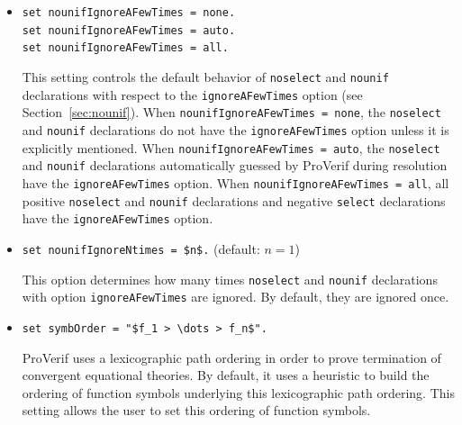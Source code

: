 \documentclass{book}
\begin{document}
\begin{itemize}
This setting modifies the expansion of terms to into processes.
With \lstinline{expandSimplifyIfCst = true},
if a process \lstinline!if $M$ then $P$ else $Q$! occurs during
this expansion and $M$ is \lstinline!true!, then this process is
transformed into $P$.
If this process occurs and $M$ is \lstinline!false!, then this process
is transformed into $Q$.
This transformation is useful because the expansion of terms into
processes may introduce such tests with constant conditions.
However, the transformation will be performed even if
the constant was already there in the initial process, which may
cut part of the process, and for instance remove restrictions that occur
in the initial process and are needed for some queries or secrecy assumptions.

With the setting \lstinline{set expandSimplifyIfCst = false.},
this transformation is not performed.

\item \lstinline{set nounifIgnoreAFewTimes = none.}\\
\lstinline{set nounifIgnoreAFewTimes = auto.}\\
\lstinline{set nounifIgnoreAFewTimes = all.}

This setting controls the default behavior of \lstinline{noselect} and
\lstinline{nounif}
declarations with respect to the \lstinline{ignoreAFewTimes} option
(see Section~\ref{sec:nounif}).
When \lstinline{nounifIgnoreAFewTimes = none}, the \lstinline{noselect} and \lstinline{nounif}
declarations do not have the \lstinline{ignoreAFewTimes} option
unless it is explicitly mentioned.
When \lstinline{nounifIgnoreAFewTimes = auto}, the \lstinline{noselect} and \lstinline{nounif}
declarations automatically guessed by ProVerif during resolution
have the \lstinline{ignoreAFewTimes} option.
When \lstinline{nounifIgnoreAFewTimes = all}, all positive \lstinline{noselect} and \lstinline{nounif}
declarations and negative \lstinline{select} declarations have the \lstinline{ignoreAFewTimes} option.

\item \lstinline{set nounifIgnoreNtimes = $n$.} (default: $n = 1$)

This option determines how many times \lstinline{noselect} and \lstinline{nounif} declarations
with option \lstinline{ignoreAFewTimes} are ignored. By default,
they are ignored once.

\item \lstinline{set symbOrder = "$f_1 > \dots > f_n$".}

ProVerif uses a lexicographic path ordering in order to prove
termination of convergent equational theories. By default,
it uses a heuristic to build the ordering of function symbols
underlying this lexicographic path ordering. This setting
allows the user to set this ordering of function symbols.


\end{itemize}
\end{document}

